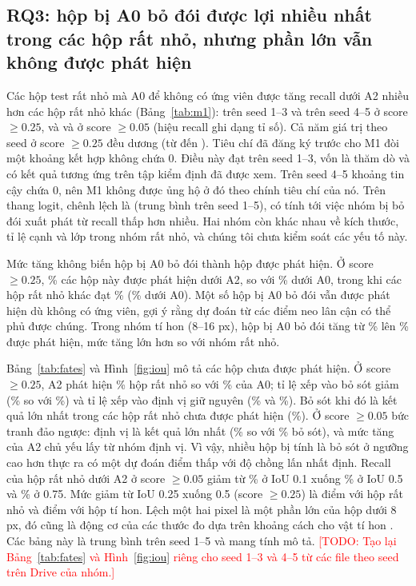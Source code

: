 \documentclass[11pt]{article}
\newcommand{\todo}[1]{\textcolor{red}{[TODO: #1]}}
\begin{document}
\subsection{RQ3: hộp bị A0 bỏ đói được lợi nhiều nhất trong các hộp rất nhỏ, nhưng phần lớn vẫn không được phát hiện}\label{sec:rq3}
Các hộp test rất nhỏ mà A0 để không có ứng viên được tăng recall dưới A2 nhiều hơn các hộp rất nhỏ khác (Bảng~\ref{tab:m1}):
\mOneOld{} trên seed 1--3 và \mOneNew{} trên seed 4--5 ở score $\geq 0.25$, và \mOneOldLow{} và \mOneNewLow{} ở score $\geq 0.05$ (hiệu
recall ghi dạng tỉ số). Cả năm giá trị theo seed ở score $\geq 0.25$ đều dương (từ \mOneSeedMin{} đến \mOneSeedMax). Tiêu chí đã đăng
ký trước cho M1 đòi một khoảng kết hợp không chứa 0. Điều này đạt trên seed 1--3, vốn là thăm dò và có kết quả tương ứng trên tập
kiểm định đã được xem. Trên seed 4--5 khoảng tin cậy chứa 0, nên M1 không được ủng hộ ở đó theo chính tiêu chí của nó. Trên thang
logit, chênh lệch là \didLogit{} (trung bình trên seed 1--5), có tính tới việc nhóm bị bỏ đói xuất phát từ recall thấp hơn nhiều.
Hai nhóm còn khác nhau về kích thước, tỉ lệ cạnh và lớp trong nhóm rất nhỏ, và chúng tôi chưa kiểm soát các yếu tố này.

Mức tăng không biến hộp bị A0 bỏ đói thành hộp được phát hiện. Ở score $\geq 0.25$, \starvedAtwo\% các hộp này được phát hiện dưới
A2, so với \starvedAzero\% dưới A0, trong khi các hộp rất nhỏ khác đạt \fedAtwo\% (\fedAzero\% dưới A0). Một số hộp bị A0 bỏ đói vẫn
được phát hiện dù không có ứng viên, gợi ý rằng dự đoán từ các điểm neo lân cận có thể phủ được chúng. Trong nhóm tí hon (8--16 px),
\tStarvedN{} hộp bị A0 bỏ đói tăng từ \tStarvedAzero\% lên \tStarvedAtwo\% được phát hiện, mức tăng lớn hơn so với nhóm rất nhỏ.

Bảng~\ref{tab:fates} và Hình~\ref{fig:iou} mô tả các hộp chưa được phát hiện. Ở score $\geq 0.25$, A2 phát hiện \vtDetAtwo\% hộp rất
nhỏ so với \vtDetAzero\% của A0; tỉ lệ xếp vào bỏ sót giảm (\vtMissAtwo\% so với \vtMissAzero\%) và tỉ lệ xếp vào định vị giữ
nguyên (\vtLocAtwo\% và \vtLocAzero\%). Bỏ sót khi đó là kết quả lớn nhất trong các hộp rất nhỏ chưa được phát hiện
(\vtMissShareUndet\%). Ở score $\geq 0.05$ bức tranh đảo ngược: định vị là kết quả lớn nhất (\vtLocShareUndetLow\% so với
\vtMissShareUndetLow\% bỏ sót), và mức tăng của A2 chủ yếu lấy từ nhóm định vị. Vì vậy, nhiều hộp bị tính là bỏ sót ở ngưỡng cao
hơn thực ra có một dự đoán điểm thấp với độ chồng lấn nhất định. Recall của hộp rất nhỏ dưới A2 ở score $\geq 0.05$ giảm từ
\recVtOne\% ở IoU 0.1 xuống \recVtHalf\% ở IoU 0.5 và \recVtThreeQ\% ở 0.75. Mức giảm từ IoU 0.25 xuống 0.5 (score $\geq 0.25$) là
\dropVt{} điểm với hộp rất nhỏ và \dropT{} điểm với hộp tí hon. Lệch một hai pixel là một phần lớn của hộp dưới 8 px, đó cũng là
động cơ của các thước đo dựa trên khoảng cách cho vật tí hon \cite{aitodv2}. Các bảng này là trung bình trên seed 1--5 và mang
tính mô tả. \todo{Tạo lại Bảng~\ref{tab:fates} và Hình~\ref{fig:iou} riêng cho seed 1--3 và 4--5 từ các file theo seed trên Drive
của nhóm.}
\end{document}

